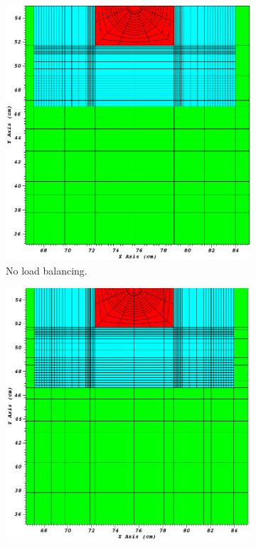 \begin{figure}[ht]
\centering
\begin{subfigure}[t]{\textwidth}
\centering
\includegraphics[scale=0.3]{../figures/level2_7_reg_zoom.png}
\caption{No load balancing.}
\label{7_regular}
\end{subfigure}
\begin{subfigure}[b]{\textwidth}
\centering
\includegraphics[scale=0.3]{../figures/level2_7_lb_zoom.png}

\end{subfigure}
\end{figure}
